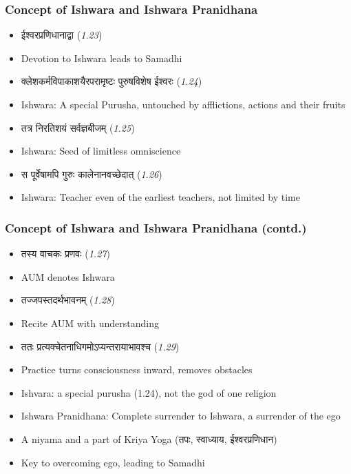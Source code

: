 \begin{frame}[fragile]\frametitle{Concept of Ishwara and Ishwara Pranidhana}
    \begin{itemize}
        \item ईश्वरप्रणिधानाद्वा (\textit{1.23})
        \item Devotion to Ishwara leads to Samadhi
        \item क्लेशकर्मविपाकाशयैरपरामृष्टः पुरुषविशेष ईश्वरः (\textit{1.24})
        \item Ishwara: A special Purusha, untouched by afflictions, actions and their fruits
        \item तत्र निरतिशयं सर्वज्ञबीजम् (\textit{1.25})
        \item Ishwara: Seed of limitless omniscience
        \item स पूर्वेषामपि गुरुः कालेनानवच्छेदात् (\textit{1.26})
        \item Ishwara: Teacher even of the earliest teachers, not limited by time
    \end{itemize}
\end{frame}

\begin{frame}[fragile]\frametitle{Concept of Ishwara and Ishwara Pranidhana (contd.)}
    \begin{itemize}
        \item तस्य वाचकः प्रणवः (\textit{1.27})
        \item AUM denotes Ishwara
        \item तज्जपस्तदर्थभावनम् (\textit{1.28})
        \item Recite AUM with understanding
        \item ततः प्रत्यक्चेतनाधिगमोऽप्यन्तरायाभावश्च (\textit{1.29})
        \item Practice turns consciousness inward, removes obstacles
        \item Ishvara: a special purusha (1.24), not the god of one religion
        \item Ishwara Pranidhana: Complete surrender to Ishwara, a surrender of the ego
        \item A niyama and a part of Kriya Yoga (तपः, स्वाध्याय, ईश्वरप्रणिधान)
        \item Key to overcoming ego, leading to Samadhi
    \end{itemize}
\end{frame}

